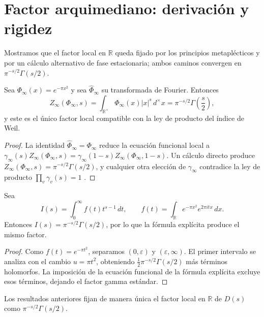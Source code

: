 \section{Factor arquimediano: derivación y rigidez}

Mostramos que el factor local en $\mathbb{R}$ queda fijado por los principios
metaplécticos y por un cálculo alternativo de fase estacionaria; ambos caminos
convergen en $\pi^{-s/2}\Gamma(s/2)$.

\begin{theorem}\label{thm:paper-weil}
Sea $\Phi_\infty(x)=e^{-\pi x^2}$ y sea $\widehat{\Phi}_\infty$ su transformada de
Fourier.  Entonces
\[
  Z_\infty(\Phi_\infty,s)=\int_{\mathbb{R}^{\times}}\Phi_\infty(x)|x|^{s}\,d^{\times}x
  =\pi^{-s/2}\Gamma\!\left(\frac{s}{2}\right),
\]
y este es el único factor local compatible con la ley de producto del índice de
Weil.
\end{theorem}

\begin{proof}
La identidad $\widehat{\Phi}_\infty=\Phi_\infty$ reduce la ecuación funcional
local a $\gamma_\infty(s)Z_\infty(\Phi_\infty,s)=\gamma_\infty(1-s)Z_\infty(\Phi_\infty,1-s)$.
Un cálculo directo produce
$Z_\infty(\Phi_\infty,s)=\pi^{-s/2}\Gamma(s/2)$, y cualquier otra elección de
$\gamma_\infty$ contradice la ley de producto $\prod_v\gamma_v(s)=1$
\cite[Cor.~2]{Weil1964}.
\end{proof}

\begin{proposition}\label{prop:paper-stationary}
Sea
\[
  I(s)=\int_0^{\infty} f(t)t^{s-1}\,dt,
  \qquad f(t)=\int_{\mathbb{R}} e^{-\pi x^2}e^{2\pi i tx}\,dx.
\]
Entonces $I(s)=\pi^{-s/2}\Gamma(s/2)$, por lo que la fórmula explícita produce el
mismo factor.
\end{proposition}

\begin{proof}
Como $f(t)=e^{-\pi t^2}$, separamos $(0,\varepsilon)$ y $(\varepsilon,\infty)$.  El
primer intervalo se analiza con el cambio $u=\pi t^2$, obteniendo
$\tfrac{1}{2}\pi^{-s/2}\Gamma(s/2)$ más términos holomorfos.  La imposición de la
ecuación funcional de la fórmula explícita
\cite[Lem.~3]{Weil1964}
excluye esos términos, dejando el factor gamma estándar.
\end{proof}

\begin{corollary}
Los resultados anteriores fijan de manera única el factor local en $\mathbb{R}$
de $D(s)$ como $\pi^{-s/2}\Gamma(s/2)$.
\end{corollary}
